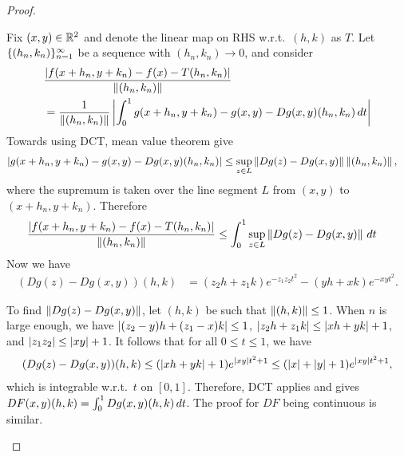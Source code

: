 \documentclass[a4paper]{article}
\begin{document}
\begin{proof}
\begin{enumerate}
          Fix $(x, y) \in \mathbb{R}^2$ and denote the linear map on RHS w.r.t.\
          $(h, k)$ as $T$. Let $\{ (h_n, k_n) \}_{n=1}^\infty$ be a sequence with
          $(h_n, k_n) \to 0$, and consider
          \begin{align*}
             & \frac{\left\lvert f(x + h_n, y + k_n) - f(x) - T (h_n, k_n)\right\rvert}
               {\left\lVert (h_n, k_n)\right\rVert} \\
             & = \frac{1}{\left\lVert (h_n, k_n)\right\rVert}
            \left\lvert \int_0^1 g(x + h_n, y + k_n) - g(x, y)
              - D g(x, y) (h_n, k_n) \, d t\right\rvert
          \end{align*}
          Towards using DCT, mean value theorem give
          \begin{align*}
            \left\lvert g(x + h_n, y + k_n) - g(x, y) - D g(x, y) (h_n, k_n)\right\rvert
             & \leq \sup_{z \in L} \left\lVert Dg(z) - D g(x, y)\right\rVert
            \left\lVert (h_n, k_n)\right\rVert,
          \end{align*}
          where the supremum is taken over the line segment $L$ from $(x,
            y)$ to $(x + h_n, y + k_n)$. Therefore
          \begin{align*}
            \frac{\left\lvert f(x + h_n, y + k_n) - f(x) - T (h_n, k_n)\right\rvert}
            {\left\lVert (h_n, k_n)\right\rVert}
             & \leq
            \int_0^1 \sup_{z \in L} \left\lVert Dg(z) - D g(x, y)\right\rVert \, d t
          \end{align*}
          Now we have
          \begin{align*}
            (Dg (z) - D g(x, y)) (h, k)
             & = (z_2 h + z_1 k) e^{- z_1 z_2 t^2} - (y h + x k) e^{-x y t^2}.
          \end{align*}

          To find $\left\lVert Dg(z) - Dg(x, y)\right\rVert$, let $(h, k)$ be such that
          $\left\lVert (h, k)\right\rVert \leq 1$. When $n$ is large enough, we have
          $\left\lvert (z_2 - y)h + (z_1 - x) k\right\rvert \leq 1$, $\left\lvert z_2 h + z_1 k\right\rvert
          \leq \left\lvert x h + y k\right\rvert + 1$, and $\left\lvert z_1 z_2\right\rvert \leq \left\lvert x y\right\rvert +
          1$. It follows that for all $0 \leq t \leq 1$, we have
          \[
            (Dg (z) - D g(x, y)) (h, k)
            \leq (\left\lvert x h + y k\right\rvert + 1)
            e^{\left\lvert x y\right\rvert t^2 + 1}
            \leq (\left\lvert x\right\rvert + \left\lvert y\right\rvert + 1) e^{\left\lvert x y\right\rvert t^2 + 1},
          \]
          which is integrable w.r.t.\ $t$ on $[0, 1]$. Therefore, DCT
          applies and gives $DF(x, y) (h, k) = \int_0^1 Dg(x, y) (h, k) \, d
          t$. The proof for $DF$ being continuous is similar.


\end{enumerate}
\end{proof}
\end{document}
